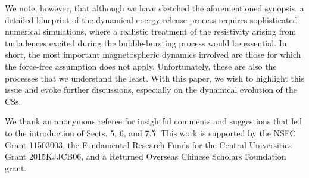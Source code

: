 \documentclass{aa}
\begin{document}
We note, however, that although we have sketched the aforementioned synopsis, a detailed blueprint of the dynamical energy-release process requires sophisticated numerical simulations, where a realistic treatment of the resistivity arising from turbulences excited during the bubble-bursting process would be essential. In short, the most important magnetospheric dynamics involved are those for which the force-free assumption does not apply. Unfortunately, these are also the processes that we understand the least. With this paper, we wish to highlight this issue and evoke further discussions, especially on the dynamical evolution of the CSs. 


\begin{acknowledgements}
We thank an anonymous referee for insightful comments and suggestions that led to the introduction of Sects. 5,  6, and 7.5.
This work is supported by the NSFC Grant 11503003, the Fundamental Research Funds for the Central Universities Grant 2015KJJCB06, and a Returned Overseas Chinese Scholars Foundation grant. 
\end{acknowledgements}

\end{document}
